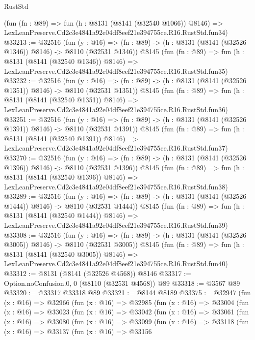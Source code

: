 \begin{lexlean}{RustStd}
\begin{coremodule}
    (fun (fn : @89) =>
    fun (h : @8131 (@8141 (@32540 @1066)) @8146) =>
    LexLeanPreserve.Cd2c3e4841a92e04df8eef21e394755ce.R16.RustStd.fun34)
@33213 := @32516
    (fun (y : @16) =>
    (fn : @89) -> (h : @8131 (@8141 (@32526 @1346)) @8146) -> @8110 (@32531 @1346))
    @8145
    (fun (fn : @89) =>
    fun (h : @8131 (@8141 (@32540 @1346)) @8146) =>
    LexLeanPreserve.Cd2c3e4841a92e04df8eef21e394755ce.R16.RustStd.fun35)
@33232 := @32516
    (fun (y : @16) =>
    (fn : @89) -> (h : @8131 (@8141 (@32526 @1351)) @8146) -> @8110 (@32531 @1351))
    @8145
    (fun (fn : @89) =>
    fun (h : @8131 (@8141 (@32540 @1351)) @8146) =>
    LexLeanPreserve.Cd2c3e4841a92e04df8eef21e394755ce.R16.RustStd.fun36)
@33251 := @32516
    (fun (y : @16) =>
    (fn : @89) -> (h : @8131 (@8141 (@32526 @1391)) @8146) -> @8110 (@32531 @1391))
    @8145
    (fun (fn : @89) =>
    fun (h : @8131 (@8141 (@32540 @1391)) @8146) =>
    LexLeanPreserve.Cd2c3e4841a92e04df8eef21e394755ce.R16.RustStd.fun37)
@33270 := @32516
    (fun (y : @16) =>
    (fn : @89) -> (h : @8131 (@8141 (@32526 @1396)) @8146) -> @8110 (@32531 @1396))
    @8145
    (fun (fn : @89) =>
    fun (h : @8131 (@8141 (@32540 @1396)) @8146) =>
    LexLeanPreserve.Cd2c3e4841a92e04df8eef21e394755ce.R16.RustStd.fun38)
@33289 := @32516
    (fun (y : @16) =>
    (fn : @89) -> (h : @8131 (@8141 (@32526 @1444)) @8146) -> @8110 (@32531 @1444))
    @8145
    (fun (fn : @89) =>
    fun (h : @8131 (@8141 (@32540 @1444)) @8146) =>
    LexLeanPreserve.Cd2c3e4841a92e04df8eef21e394755ce.R16.RustStd.fun39)
@33308 := @32516
    (fun (y : @16) =>
    (fn : @89) -> (h : @8131 (@8141 (@32526 @3005)) @8146) -> @8110 (@32531 @3005))
    @8145
    (fun (fn : @89) =>
    fun (h : @8131 (@8141 (@32540 @3005)) @8146) =>
    LexLeanPreserve.Cd2c3e4841a92e04df8eef21e394755ce.R16.RustStd.fun40)
@33312 := @8131 (@8141 (@32526 @4568)) @8146
@33317 := Option.noConfusion.{0, 0} (@8110 (@32531 @4568)) @89
@33318 := @3567 @89
@33320 := @33317 @33318 @89
@33321 := @8144 @8189
@33375 := @32947
    (fun (x : @16) =>
    @32966
      (fun (x : @16) =>
      @32985
        (fun (x : @16) =>
        @33004
          (fun (x : @16) =>
          @33023
            (fun (x : @16) =>
            @33042
              (fun (x : @16) =>
              @33061
                (fun (x : @16) =>
                @33080
                  (fun (x : @16) =>
                  @33099
                    (fun (x : @16) =>
                    @33118
                      (fun (x : @16) =>
                      @33137
                        (fun (x : @16) =>
                        @33156

\end{coremodule}
\end{lexlean}
